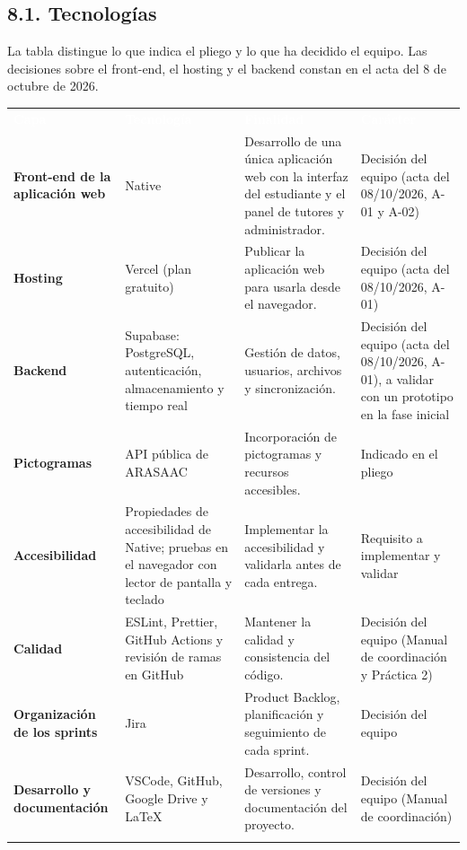 \documentclass[11pt,a4paper]{article}
\newcommand{\hl}[1]{\textcolor{gblue}{\textbf{#1}}}
\begin{document}
\subsection*{8.1. Tecnologías}
La tabla distingue lo que indica el pliego y lo que ha decidido el equipo. Las decisiones sobre el front-end, el hosting y el backend constan en el acta del 8 de octubre de 2026.

\par\noindent\begin{tabular}{@{}>{\raggedright\arraybackslash}p{}>{\raggedright\arraybackslash}p{}>{\raggedright\arraybackslash}p{}>{\raggedright\arraybackslash}p{}@{}}
\rowcolor{gblue}\textcolor{white}{\textbf{Capa}} & \textcolor{white}{\textbf{Tecnología}} & \textcolor{white}{\textbf{Finalidad}} & \textcolor{white}{\textbf{Carácter}} \\
\hl{Front-end de la aplicación web} & Native & Desarrollo de una única aplicación web con la interfaz del estudiante y el panel de tutores y administrador. & Decisión del equipo (acta del 08/10/2026, A-01 y A-02) \\ \arrayrulecolor{gline}\hline
\rowcolor{glight}
\hl{Hosting} & Vercel (plan gratuito) & Publicar la aplicación web para usarla desde el navegador. & Decisión del equipo (acta del 08/10/2026, A-01) \\ \arrayrulecolor{gline}\hline
\hl{Backend} & Supabase: PostgreSQL, autenticación, almacenamiento y tiempo real & Gestión de datos, usuarios, archivos y sincronización. & Decisión del equipo (acta del 08/10/2026, A-01), a validar con un prototipo en la fase inicial \\ \arrayrulecolor{gline}\hline
\rowcolor{glight}
\hl{Pictogramas} & API pública de ARASAAC & Incorporación de pictogramas y recursos accesibles. & Indicado en el pliego \\ \arrayrulecolor{gline}\hline
\hl{Accesibilidad} & Propiedades de accesibilidad de Native; pruebas en el navegador con lector de pantalla y teclado & Implementar la accesibilidad y validarla antes de cada entrega. & Requisito a implementar y validar \\ \arrayrulecolor{gline}\hline
\rowcolor{glight}
\hl{Calidad} & ESLint, Prettier, GitHub Actions y revisión de ramas en GitHub & Mantener la calidad y consistencia del código. & Decisión del equipo (Manual de coordinación y Práctica 2) \\ \arrayrulecolor{gline}\hline
\hl{Organización de los sprints} & Jira & Product Backlog, planificación y seguimiento de cada sprint. & Decisión del equipo \\ \arrayrulecolor{gline}\hline
\rowcolor{glight}
\hl{Desarrollo y \mbox{documentación}} & VSCode, GitHub, Google Drive y LaTeX & Desarrollo, control de versiones y documentación del proyecto. & Decisión del equipo (Manual de coordinación) \\ \arrayrulecolor{gline}\hline
\end{tabular}\par\medskip
\end{document}
